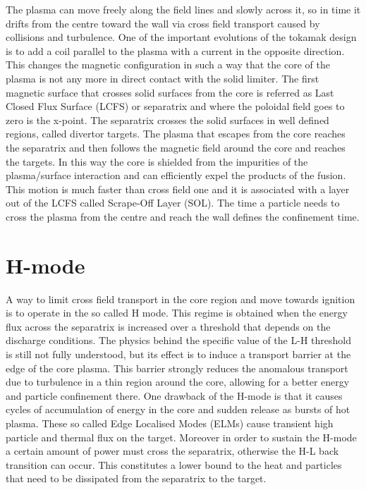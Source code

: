 The plasma can move freely along the field lines and slowly across it, so in time it drifts from the centre toward the wall via cross field transport caused by collisions and turbulence. One of the important
evolutions of the tokamak design is to add a coil parallel to the plasma with a current in the opposite direction. This changes the magnetic configuration in such a way that the core of the plasma is not any more in direct contact with the solid limiter. The first magnetic surface that crosses solid surfaces from the core is referred as Last Closed Flux Surface (LCFS) or separatrix and where the poloidal field goes to zero is the x-point. The separatrix crosses the solid surfaces in well defined regions, called divertor targets. The plasma that escapes from the core reaches the separatrix and then follows the magnetic field around the core and reaches the targets. In this way the core is shielded from the impurities of the plasma/surface interaction and can efficiently expel the products of the fusion. This motion is much faster than cross field one and it is associated with a layer out of the LCFS called Scrape-Off Layer (SOL). The time a particle needs to cross the plasma from the centre and reach the wall defines the confinement time.

\section{H-mode}
A way to limit cross field transport in the core region and move towards ignition is to operate in the so called H mode. This regime is obtained when the energy flux across the separatrix is increased over a threshold that depends on the discharge conditions.\cite{Ryter1998} The physics behind the specific value of the L-H threshold is still not fully understood, but its effect is to induce a transport barrier at the edge of the core plasma. This barrier strongly reduces the anomalous transport due to turbulence in a thin region around the core, allowing for a better energy and particle confinement there. One drawback of the H-mode is that it causes cycles of accumulation of energy in the core and sudden release as bursts of hot plasma. These so called Edge Localised Modes (ELMs) cause transient high particle and thermal flux on the target. Moreover in order to sustain the H-mode a certain amount of power must cross the separatrix, otherwise the H-L back transition can occur. This constitutes a lower bound to the heat and particles that need to be dissipated from the separatrix to the target.

